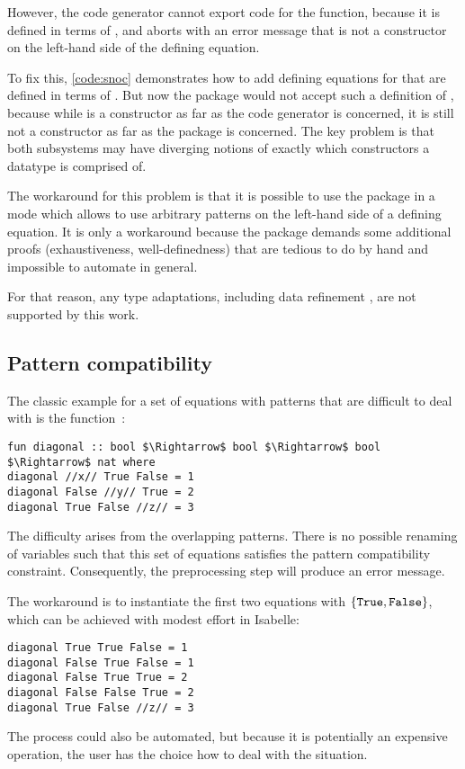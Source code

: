 However, the code generator cannot export code for the  function, because it is defined in terms of , and aborts with an error message that  is not a constructor on the left-hand side of the defining equation.

To fix this, \cref{code:snoc} demonstrates how to add defining equations for  that are defined in terms of .
But now the  package would not accept such a definition of , because while  is a constructor as far as the code generator is concerned, it is still not a constructor as far as the  package is concerned.
The key problem is that both subsystems may have diverging notions of exactly which constructors a datatype is comprised of.

The workaround for this problem is that it is possible to use the  package in a mode which allows to use arbitrary patterns on the left-hand side of a defining equation.
It is only a workaround because the package demands some additional proofs (exhaustiveness, well-definedness) that are tedious to do by hand and impossible to automate in general.

For that reason, any type adaptations, including data refinement \cite{haftmann2013refinement}, are not supported by this work.

\subsection{Pattern compatibility}

The classic example for a set of equations with patterns that are difficult to deal with is the  function~\cite{slind1999terminating,peytonjones1987implementation}:
%
\begin{lstlisting}[language=Isabelle]
fun diagonal :: bool $\Rightarrow$ bool $\Rightarrow$ bool $\Rightarrow$ nat where
diagonal //x// True False = 1
diagonal False //y// True = 2
diagonal True False //z// = 3
\end{lstlisting}
%
The difficulty arises from the overlapping patterns.
There is no possible renaming of variables such that this set of equations satisfies the pattern compatibility constraint.
Consequently, the preprocessing step will produce an error message.

The workaround is to instantiate the first two equations with $\{\texttt{\textup{True}}, \texttt{\textup{False}}\}$, which can be achieved with modest effort in Isabelle:
%
\begin{lstlisting}[language=Isabelle]
diagonal True True False = 1
diagonal False True False = 1
diagonal False True True = 2
diagonal False False True = 2
diagonal True False //z// = 3
\end{lstlisting}
%
The process could also be automated, but because it is potentially an expensive operation, the user has the choice how to deal with the situation.

